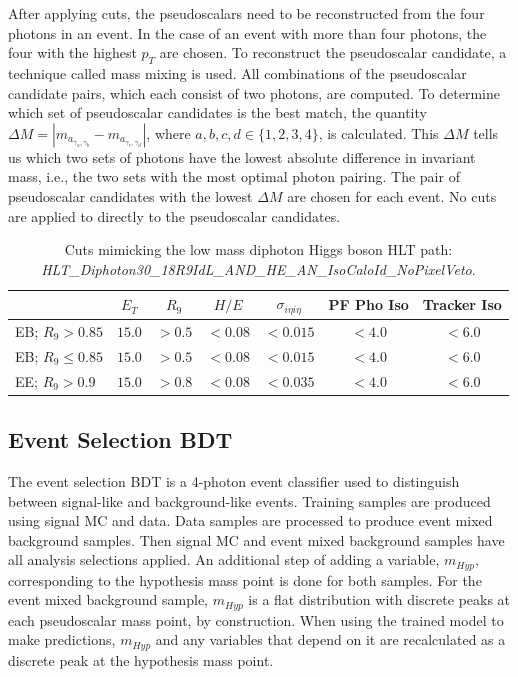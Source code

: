 \documentclass[12pt]{article}
\begin{document}
After applying cuts, the pseudoscalars need to be reconstructed from the four photons in an event. In the case of an event with more than four photons, the four with the highest $p_T$ are chosen. To reconstruct the pseudoscalar candidate, a technique called mass mixing is used. All combinations of the pseudoscalar candidate pairs, which each consist of two photons, are computed. To determine which set of pseudoscalar candidates is the best match, the quantity $\Delta M = |m_{a_{\gamma_{a}, \gamma_{b}}} - m_{a_{\gamma_{c}, \gamma_{d}}}|$, where $a,b,c,d \in \{1,2,3,4\}$, is calculated. This $\Delta M$ tells us which two sets of photons have the lowest absolute difference in invariant mass, i.e., the two sets with the most optimal photon pairing. The pair of pseudoscalar candidates with the lowest $\Delta M$ are chosen for each event. No cuts are applied to directly to the pseudoscalar candidates.\par

\begin{table}
    \centering
    \begin{tabular}{l|c|c|c|c|c|c}
         & $E_T$ & $R_9$ & $H/E$ & $\sigma_{i\eta i\eta}$ & PF Pho Iso & Tracker Iso\\ \hline
        EB; $R_9>0.85$ & $15.0$ & $> 0.5$ & $<0.08$ & $<0.015$ & $<4.0$ & $<6.0$\\
        EB; $R_9\leq0.85$ & $15.0$ & $> 0.5$ & $<0.08$ & $<0.015$ & $<4.0$ & $<6.0$\\
        EE; $R_9>0.9$ & $15.0$ & $> 0.8$ & $<0.08$ & $<0.035$ & $<4.0$ & $<6.0$
    \end{tabular}
    \caption{Cuts mimicking the low mass diphoton Higgs boson HLT path:\\ \textit{HLT\_Diphoton30\_18R9IdL\_AND\_HE\_AN\_IsoCaloId\_NoPixelVeto}.}
    \label{tab:hlt_cuts_2018}
\end{table}

\subsection{Event Selection BDT}
The event selection BDT is a 4-photon event classifier used to distinguish between signal-like and background-like events. Training samples are produced using signal MC and data. Data samples are processed to produce event mixed background samples. Then signal MC and event mixed background samples have all analysis selections applied. An additional step of adding a variable, $m_{Hyp}$, corresponding to the hypothesis mass point is done for both samples. For the event mixed background sample, $m_{Hyp}$ is a flat distribution with discrete peaks at each pseudoscalar mass point, by construction. When using the trained model to make predictions, $m_{Hyp}$ and any variables that depend on it are recalculated as a discrete peak at the hypothesis mass point.\par
\end{document}
